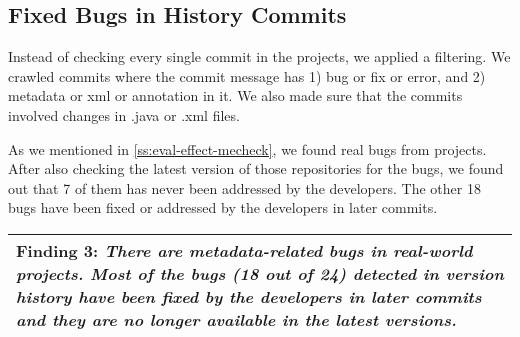 \subsection{Fixed Bugs in History Commits}\label{ss:eval-history}

Instead of checking every single commit in the projects, we applied a filtering. We crawled commits where the commit message has 1) bug or fix or error, and 2) metadata or xml or annotation in it. We also made sure that the commits involved changes in .java or .xml files.

As we mentioned in \ref{ss:eval-effect-mecheck}, we found \totalInteresting real bugs from \totalInterestingEAs projects. After also checking the latest version of those repositories for the \totalInteresting bugs, we found out that 7 of them has never been addressed by the developers. The other 18 bugs have been fixed or addressed by the developers in later commits.

\vspace{0.5em}
\noindent\begin{tabular}{|p{8.1cm}|}
	\hline
	\textbf{Finding 3:} \emph{There are metadata-related bugs in real-world projects. Most of the bugs (18 out of 24) \tool detected in version history have been fixed by the developers in later commits and they are no longer available in the latest versions.}
	\\
	\hline
\end{tabular}